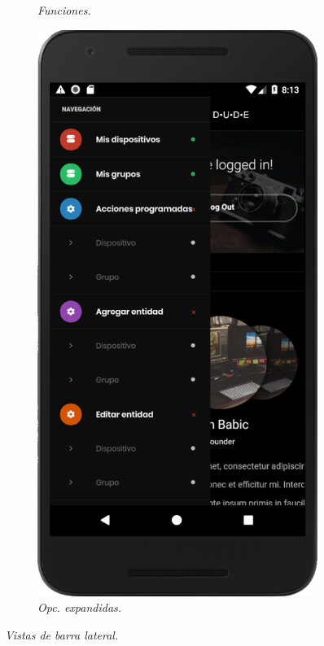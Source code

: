 \begin{figure}[H]
\begin{subfigure}[b]{0.2\textwidth}
    \caption{\textit{Funciones.}}
    \label{fig:app-movil-sidebar}
  \end{subfigure}
  \begin{subfigure}[b]{0.2\textwidth}
    \includegraphics[width=\textwidth, keepaspectratio]{images/app-movil-sidebar-open}
    \caption{\textit{Opc. expandidas.}}
    \label{fig:app-movil-sidebar-open}
  \end{subfigure}

\caption{\textit{Vistas de barra lateral.}}
\end{figure}


